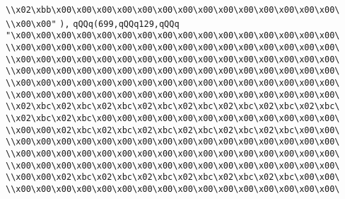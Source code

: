 \verb|\\x02\xbb\x00\x00\x00\x00\x00\x00\x00\x00\x00\x00\x00\x00\x00\x00\|\newline
\verb|\\x00\x00"|\newline
\verb|),|\newline
\verb|qQQq(699,qQQq129,qQQq|\newline
\verb|"\x00\x00\x00\x00\x00\x00\x00\x00\x00\x00\x00\x00\x00\x00\x00\x00\|\newline
\verb|\\x00\x00\x00\x00\x00\x00\x00\x00\x00\x00\x00\x00\x00\x00\x00\x00\|\newline
\verb|\\x00\x00\x00\x00\x00\x00\x00\x00\x00\x00\x00\x00\x00\x00\x00\x00\|\newline
\verb|\\x00\x00\x00\x00\x00\x00\x00\x00\x00\x00\x00\x00\x00\x00\x00\x00\|\newline
\verb|\\x00\x00\x00\x00\x00\x00\x00\x00\x00\x00\x00\x00\x00\x00\x00\x00\|\newline
\verb|\\x00\x00\x00\x00\x00\x00\x00\x00\x00\x00\x00\x00\x00\x00\x00\x00\|\newline
\verb|\\x02\xbc\x02\xbc\x02\xbc\x02\xbc\x02\xbc\x02\xbc\x02\xbc\x02\xbc\|\newline
\verb|\\x02\xbc\x02\xbc\x00\x00\x00\x00\x00\x00\x00\x00\x00\x00\x00\x00\|\newline
\verb|\\x00\x00\x02\xbc\x02\xbc\x02\xbc\x02\xbc\x02\xbc\x02\xbc\x00\x00\|\newline
\verb|\\x00\x00\x00\x00\x00\x00\x00\x00\x00\x00\x00\x00\x00\x00\x00\x00\|\newline
\verb|\\x00\x00\x00\x00\x00\x00\x00\x00\x00\x00\x00\x00\x00\x00\x00\x00\|\newline
\verb|\\x00\x00\x00\x00\x00\x00\x00\x00\x00\x00\x00\x00\x00\x00\x00\x00\|\newline
\verb|\\x00\x00\x02\xbc\x02\xbc\x02\xbc\x02\xbc\x02\xbc\x02\xbc\x00\x00\|\newline
\verb|\\x00\x00\x00\x00\x00\x00\x00\x00\x00\x00\x00\x00\x00\x00\x00\x00\|\newline
